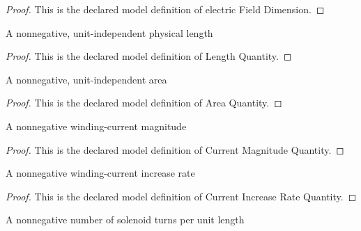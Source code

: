 \begin{proof}
  This is the declared model definition of electric Field Dimension.
\end{proof}
\begin{definition}
  \label{def:physics:phyx-mini-0938:phyxminiproblems-problemphyxmini0938-lengthquantity}
  A nonnegative, unit-independent physical length
\end{definition}
\begin{proof}
  This is the declared model definition of Length Quantity.
\end{proof}
\begin{definition}
  \label{def:physics:phyx-mini-0938:phyxminiproblems-problemphyxmini0938-areaquantity}
  A nonnegative, unit-independent area
\end{definition}
\begin{proof}
  This is the declared model definition of Area Quantity.
\end{proof}
\begin{definition}
  \label{def:physics:phyx-mini-0938:phyxminiproblems-problemphyxmini0938-currentmagnitudequantity}
  A nonnegative winding-current magnitude
\end{definition}
\begin{proof}
  This is the declared model definition of Current Magnitude Quantity.
\end{proof}
\begin{definition}
  \label{def:physics:phyx-mini-0938:phyxminiproblems-problemphyxmini0938-currentincreaseratequantity}
  A nonnegative winding-current increase rate
\end{definition}
\begin{proof}
  This is the declared model definition of Current Increase Rate Quantity.
\end{proof}
\begin{definition}
  \label{def:physics:phyx-mini-0938:phyxminiproblems-problemphyxmini0938-turndensityquantity}
  A nonnegative number of solenoid turns per unit length
\end{definition}
